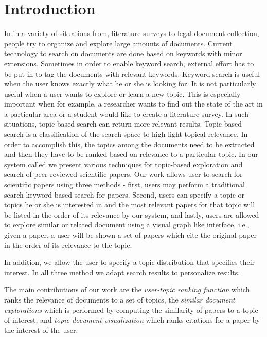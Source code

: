 \section{Introduction}

In in a variety of situations from, literature surveys to legal document
collection, people try to organize and explore large amounts of documents. 
Current technology to search on documents are done based on keywords with 
minor extensions. Sometimes in order to enable keyword search, external 
effort has to be put in to tag the documents with relevant keywords. Keyword 
search is useful when the user knows exactly what he or she is looking for. 
It is not particularly useful when a user wants to explore or learn a new 
topic. This is especially important when for example, a researcher wants 
to find out the state of the art in a particular area or a student would like to
create a literature survey. In such situations, topic-based search can return 
more relevant results. Topic-based search is a classification of the search
space to high light topical relevance. 
In order to accomplish this, the topics among the documents need to be 
extracted and then they have to be ranked based on relevance to a particular 
topic. In our system called \system we present various techniques for 
topic-based exploration and search of peer reviewed scientific papers. Our 
work allows user to search for scientific papers using three methods - first, 
users may perform a traditional search keyword based search for papers. 
Second, users can specify a topic or topics he or she is interested in and 
the most relevant papers for that topic will be listed in the order of its 
relevance by our system, and lastly, users are allowed to explore similar or 
related document using a visual graph like interface, i.e., given a paper, 
a user will be shown a set of papers which cite the original paper in the 
order of its relevance to the topic. 

In addition, we allow the user to specify a topic distribution that specifies their
interest. In all three method we adapt search results to personalize results.

The main contributions of our work are the \textit{user-topic ranking function} 
which ranks the relevance of documents to a set of topics, the 
\textit{similar document explorations} which is performed by computing the 
similarity of papers to a topic of interest, and \textit{topic-document visualization} which 
ranks citations for a paper by the interest of the user.
